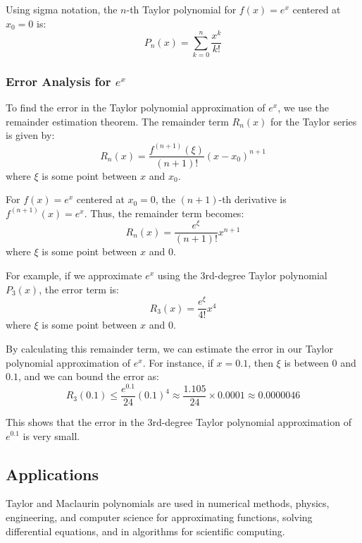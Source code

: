 \documentclass{article}
\begin{document}
Using sigma notation, the \( n \)-th Taylor polynomial for \( f(x) = e^x \) centered at \( x_0 = 0 \) is:
\[ P_n(x) = \sum_{k=0}^{n} \frac{x^k}{k!} \]

\subsubsection*{Error Analysis for \( e^x \)}

To find the error in the Taylor polynomial approximation of \( e^x \), we use the remainder estimation theorem. The remainder term \( R_n(x) \) for the Taylor series is given by:
\[ R_n(x) = \frac{f^{(n+1)}(\xi)}{(n+1)!} (x - x_0)^{n+1} \]
where \( \xi \) is some point between \( x \) and \( x_0 \).

For \( f(x) = e^x \) centered at \( x_0 = 0 \), the \((n+1)\)-th derivative is \( f^{(n+1)}(x) = e^x \). Thus, the remainder term becomes:
\[ R_n(x) = \frac{e^{\xi}}{(n+1)!} x^{n+1} \]
where \( \xi \) is some point between \( x \) and \( 0 \).

For example, if we approximate \( e^x \) using the 3rd-degree Taylor polynomial \( P_3(x) \), the error term is:
\[ R_3(x) = \frac{e^{\xi}}{4!} x^4 \]
where \( \xi \) is some point between \( x \) and \( 0 \).

By calculating this remainder term, we can estimate the error in our Taylor polynomial approximation of \( e^x \). For instance, if \( x = 0.1 \), then \( \xi \) is between \( 0 \) and \( 0.1 \), and we can bound the error as:
\[ R_3(0.1) \leq \frac{e^{0.1}}{24} (0.1)^4 \approx \frac{1.105}{24} \times 0.0001 \approx 0.0000046 \]

This shows that the error in the 3rd-degree Taylor polynomial approximation of \( e^{0.1} \) is very small.



\subsection*{Applications}
Taylor and Maclaurin polynomials are used in numerical methods, physics, engineering, and computer science for approximating functions, solving differential equations, and in algorithms for scientific computing.
\end{document}
